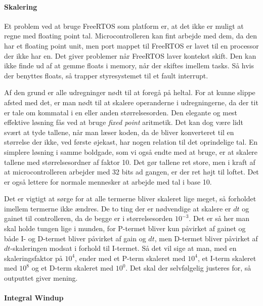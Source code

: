 \paragraph{Skalering}

Et problem ved at bruge FreeRTOS som platform er, at det ikke er muligt at regne med floating point tal. Microcontrolleren kan fint arbejde med dem, da den har et floating point unit, men port mappet til FreeRTOS er lavet til en processor der ikke har en. Det giver problemer når FreeRTOS laver kontekst skift. Den kan ikke finde ud af at gemme floats i memory, når der skiftes imellem tasks. Så hvis der benyttes floats, så trapper styresystemet til et fault interrupt.

Af den grund er alle udregninger nødt til at foregå på heltal. For at kunne slippe afsted med det, er man nødt til at skalere operanderne i udregningerne, da der tit er tale om kommatal i en eller anden størrelsesorden. Den elegante og mest effektive løsning fås ved at bruge \textit{fixed point} aritmetik. Det kan dog være lidt svært at tyde tallene, når man læser koden, da de bliver konverteret til en størrelse der ikke, ved første øjekast, har nogen relation til det oprindelige tal. En simplere løsning i samme boldgade, som vi også endte med at bruge, er at skalere tallene med størrelsesordner af faktor 10. Det gør tallene ret store, men i kraft af at microcontrolleren arbejder med 32 bits ad gangen, er der ret højt til loftet. Det er også lettere for normale mennesker at arbejde med tal i base 10.

Det er vigtigt at sørge for at alle termerne bliver skaleret lige meget, så forholdet imellem termerne ikke ændres. De to ting der er nødvendige at skalere er $dt$ og gainet til controlleren, da de begge er i størrelsesorden $10^{-3}$. Det er så her man skal holde tungen lige i munden, for P-termet bliver kun påvirket af gainet og både I- og D-termet bliver påvirket af gain og $dt$, men D-termet bliver påvirket af $dt$-skaleringen modsat i forhold til I-termet. Så det vil sige at man, med en skaleringsfaktor på $10^4$, ender med et P-term skaleret med $10^4$, et I-term skaleret med $10^8$ og et D-term skaleret med $10^0$. Det skal der selvfølgelig justeres for, så outputtet giver mening.

\paragraph{Integral Windup}

